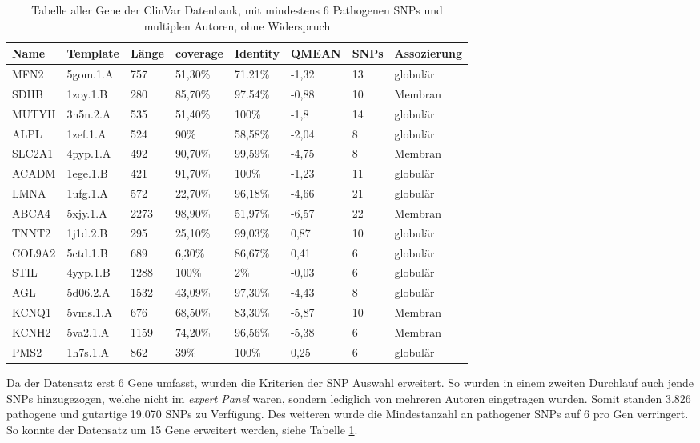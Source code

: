 \begin{table}[]
    \centering
    \begin{tabular}{llllllll}
    \hline
    \multicolumn{1}{|l|}{Name} & \multicolumn{1}{l|}{Template} & \multicolumn{1}{l|}{Länge} & \multicolumn{1}{l|}{coverage} & \multicolumn{1}{l|}{Identity} & \multicolumn{1}{l|}{QMEAN} & \multicolumn{1}{l|}{SNPs} & \multicolumn{1}{l|}{Assozierung} \\ \hline
    MFN2 & 5gom.1.A & 757 & 51,30\% & 71.21\% & -1,32 & 13 & globulär \\
    \rowcolor[HTML]{CBFFCB} 
    SDHB & 1zoy.1.B & 280 & 85,70\% & 97.54\% & -0,88 & 10 & Membran \\
    MUTYH & 3n5n.2.A & 535 & 51,40\% & 100\% & -1,8 & 14 & globulär \\
    ALPL & 1zef.1.A & 524 & 90\% & 58,58\% & -2,04 & 8 & globulär \\
    \rowcolor[HTML]{9AFF99} 
    SLC2A1 & 4pyp.1.A & 492 & 90,70\% & 99,59\% & -4,75 & 8 & Membran \\
    \rowcolor[HTML]{9AFF99} 
    ACADM & 1ege.1.B & 421 & 91,70\% & 100\% & -1,23 & 11 & globulär \\
    LMNA & 1ufg.1.A & 572 & 22,70\% & 96,18\% & -4,66 & 21 & globulär \\
    ABCA4 & 5xjy.1.A & 2273 & 98,90\% & 51,97\% & -6,57 & 22 & Membran \\
    TNNT2 & 1j1d.2.B & 295 & 25,10\% & 99,03\% & 0,87 & 10 & globulär \\
    COL9A2 & 5ctd.1.B & 689 & 6,30\% & 86,67\% & 0,41 & 6 & globulär \\
    STIL & 4yyp.1.B & 1288 & 100\% & 2\% & -0,03 & 6 & globulär \\
    AGL & 5d06.2.A & 1532 & 43,09\% & 97,30\% & -4,43 & 8 & globulär \\
    \rowcolor[HTML]{CBFFCB} 
    KCNQ1 & 5vms.1.A & 676 & 68,50\% & 83,30\% & -5,87 & 10 & Membran \\
    \rowcolor[HTML]{CBFFCB} 
    KCNH2 & 5va2.1.A & 1159 & 74,20\% & 96,56\% & -5,38 & 6 & Membran \\
    PMS2 & 1h7s.1.A & 862 & 39\% & 100\% & 0,25 & 6 & globulär
    \end{tabular}
    \caption{Tabelle aller Gene der ClinVar Datenbank, mit mindestens 6 Pathogenen SNPs und multiplen Autoren, ohne Widerspruch}
    \label{tab:multiple_subs_snps}
\end{table}

Da der Datensatz erst 6 Gene umfasst, wurden die Kriterien der \ac{SNP} Auswahl erweitert. So wurden in einem zweiten Durchlauf auch jende \ac{SNPs} hinzugezogen, welche nicht im \emph{expert Panel} waren, sondern lediglich von mehreren Autoren eingetragen wurden. Somit standen 3.826 pathogene und gutartige 19.070 \ac{SNPs} zu Verfügung. Des weiteren wurde die Mindestanzahl an pathogener SNPs auf 6 pro Gen verringert. So konnte der Datensatz um 15 Gene erweitert werden, siehe Tabelle \ref{tab:multiple_subs_snps}.



